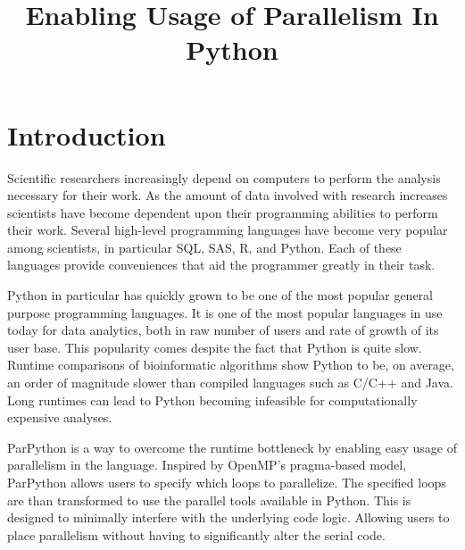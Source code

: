 \documentclass[conference]{IEEEtran}
\begin{document}
\title{Enabling Usage of Parallelism In Python}
\author{
}

\maketitle

\begin{abstract}

\end{abstract}

\section{Introduction}

Scientific researchers increasingly depend on computers to perform
the analysis necessary for their work.
As the amount of data involved with research increases
scientists have become dependent upon their programming 
abilities to perform their work.
Several high-level programming languages have become very popular among scientists, in particular SQL, SAS, R, and Python.\cite{kdnuggetSurvey}
Each of these languages provide conveniences that aid the programmer 
greatly in their task.


Python in particular has quickly grown to be one of the most popular general purpose programming languages.
It is one of the most popular languages in use today for data 
analytics, both in raw number of users\cite{kdnuggetSurvey} and rate 
of growth of its user base.\cite{kdnuggetGrowthSurvey}
This popularity comes despite the fact that Python is quite slow.
Runtime comparisons of bioinformatic algorithms
show Python to be, on average, an order of magnitude slower than 
compiled languages such as C/C++ and Java. \cite{fourment2008comparison}
Long runtimes can lead to Python becoming infeasible
for computationally expensive analyses.

ParPython is a way to overcome the runtime bottleneck by enabling
easy usage of parallelism in the language. 
Inspired by OpenMP's pragma-based model\cite{dagum1998openmp}, 
ParPython allows users to specify which loops to parallelize. 
The specified loops are than
transformed to use the parallel tools available in Python. 
This is designed to minimally interfere with the underlying code logic.
Allowing users to place parallelism without having to significantly alter
the serial code.
\end{document}

